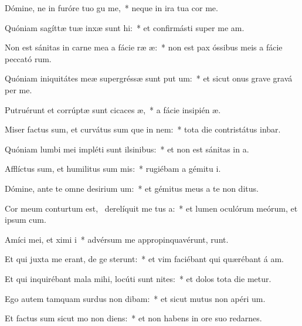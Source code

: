 \item Dómine, ne in furóre tuo gu me,~* neque in ira tua cor me.
\item Quóniam sagíttæ tuæ inxæ sunt hi:~* et confirmásti super me  am.
\item Non est sánitas in carne mea a fácie ræ æ:~* non est pax óssibus meis a fácie peccató rum.
\item Quóniam iniquitátes meæ supergréssæ sunt put um:~* et sicut onus grave gravá  per me.
\item Putruérunt et corrúptæ sunt cicaces æ,~* a fácie insipién æ.
\item Miser factus sum, et curvátus sum que in nem:~* tota die contristátus inbar.
\item Quóniam lumbi mei impléti sunt ilsinibus:~* et non est sánitas in  a.
\item Afflíctus sum, et humilitus sum mis:~* rugiébam a gémitu  i.
\item Dómine, ante te omne desirium um:~* et gémitus meus a te non  ditus.
\item Cor meum conturtum est,~\pscross{} derelíquit me tus a:~* et lumen oculórum meórum, et ipsum   cum.
\item Amíci mei, et ximi i~* advérsum me appropinquavérunt,  runt.
\item Et qui juxta me erant, de ge sterunt:~* et vim faciébant qui quærébant á am.
\item Et qui inquirébant mala mihi, locúti sunt nites:~* et dolos tota die metur.
\item Ego autem tamquam surdus non dibam:~* et sicut mutus non apéri  um.
\item Et factus sum sicut mo non diens:~* et non habens in ore suo redarnes.
